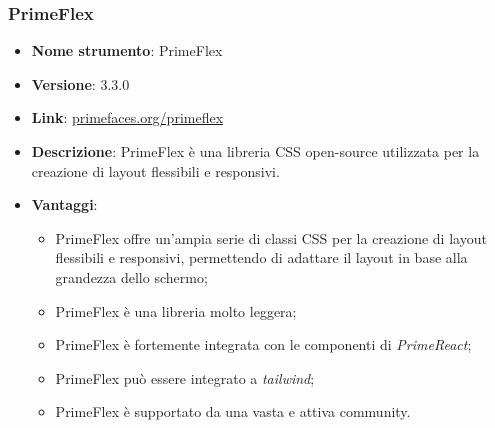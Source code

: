 \subsubsection{PrimeFlex}
\begin{itemize}
      \item \textbf{Nome strumento}: PrimeFlex
      \item \textbf{Versione}: 3.3.0
      \item \textbf{Link}: \href{https://primereact.org/}{primefaces.org/primeflex}
      \item \textbf{Descrizione}: PrimeFlex è una libreria CSS open-source utilizzata per la creazione di layout flessibili e responsivi.
      \item \textbf{Vantaggi}:
            \begin{itemize}
                  \item PrimeFlex offre un'ampia serie di classi CSS per la creazione di layout flessibili e responsivi, permettendo di adattare il layout
                        in base alla grandezza dello schermo;
                  \item PrimeFlex è una libreria molto leggera;
                  \item PrimeFlex è fortemente integrata con le componenti di \textit{PrimeReact};
                  \item PrimeFlex può essere integrato a \textit{tailwind};
                  \item PrimeFlex è supportato da una vasta e attiva community.
            \end{itemize}
\end{itemize}

